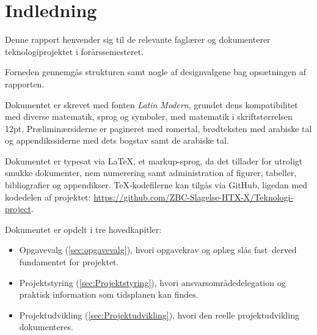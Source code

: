 \section{Indledning}
    Denne rapport henvender sig til de relevante faglærer og dokumenterer teknologiprojektet i forårssemesteret. 

    Forneden gennemgås strukturen samt nogle af designvalgene bag opsætningen af rapporten.

    Dokumentet er skrevet med fonten \textit{Latin Modern}, grundet dens kompatibilitet med diverse matematik, sprog og symboler, med matematik i skriftstørrelsen 12pt. Præliminærsiderne er pagineret med romertal, brødteksten med arabiske tal og appendikssiderne med dets bogstav samt de arabiske tal.

    Dokumentet er typesat via \LaTeX, et markup-sprog, da det tillader for utroligt smukke dokumenter, nem numerering samt administration af figurer, tabeller, bibliografier og appendikser. \TeX-kodefilerne kan tilgås via GitHub, ligedan med kodedelen af projektet: \url{https://github.com/ZBC-Slagelse-HTX-X/Teknologi-project}.

    Dokumentet er opdelt i tre hovedkapitler:
    \begin{itemize}
        \item Opgavevalg (\ref{sec:opgavevalg}), hvori opgavekrav og oplæg slås fast--derved fundamentet for projektet.
        \item Projektstyring (\ref{sec:Projektstyring}), hvori ansvarsområdedelegation  og praktisk information som tidsplanen kan findes.
        \item Projektudvikling (\ref{sec:Projektudvikling}), hvori den reelle projektudvikling dokumenteres.
    \end{itemize}